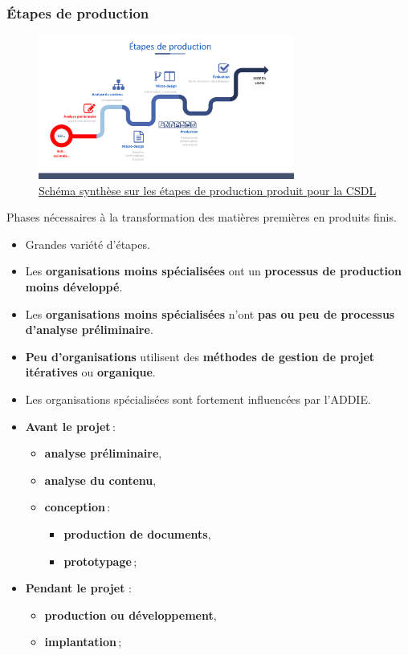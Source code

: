 						\begin{frame}[allowframebreaks]
						\frametitle{Étapes de production}
						\begin{figure}
                     			\centering
                    			 \includegraphics[width = 0.75\textwidth]{etapes.png}
                     			\caption{\tiny{\href{run:etapes.png}{Schéma synthèse sur les étapes de production produit pour la CSDL}}}
                   			\end{figure}
                   			
                   			
                        			Phases nécessaires à la transformation des matières premières en produits finis.
						\begin{itemize}
						\framebreak
						\item Grandes variété d'étapes.
						\item Les \textbf{organisations moins spécialisées} ont un \textbf{processus de production moins développé}.
						\item Les \textbf{organisations moins spécialisées} n'ont \textbf{pas ou peu de processus d'analyse préliminaire}.
						\item \textbf{Peu d'organisations} utilisent des \textbf{méthodes de gestion de projet itératives} ou \textbf{organique}.
						\item Les organisations spécialisées sont fortement influencées par l'ADDIE.
						\end{itemize}
						\framebreak
						
						\begin{itemize}
						\item \textbf{Avant le projet}\,: 
							\begin{itemize}
							\item \textbf{analyse préliminaire},
							\item \textbf{analyse du contenu},
							\item \textbf{conception}\,:
								\begin{itemize}
								\item \textbf{production de documents},
								\item \textbf{prototypage}\,;
								\end{itemize}
							\end{itemize}
						\item \textbf{Pendant le projet }:
							\begin{itemize}
							\item \textbf{production ou développement},
							\item \textbf{implantation}\,;
							\end{itemize}


\end{itemize}
\end{frame}
